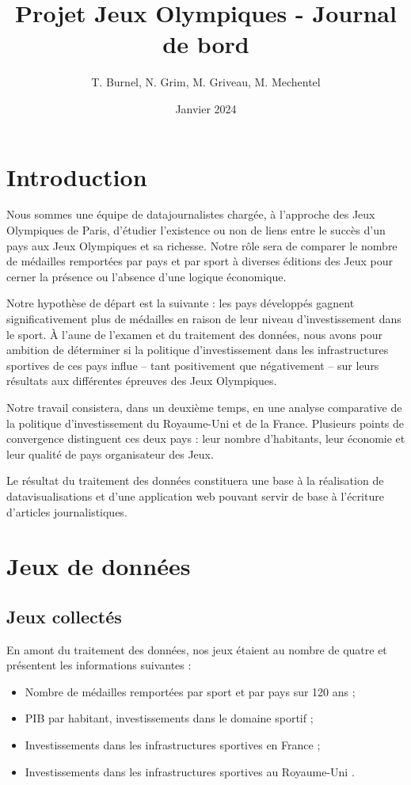 \documentclass[hidelinks, 12pt]{article}
\title{Projet Jeux Olympiques - Journal de bord}
\date{Janvier 2024}
\author{T. Burnel, N. Grim, M. Griveau, M. Mechentel}
\begin{document}
\maketitle
	
\section{Introduction}
	
Nous sommes une équipe de datajournalistes chargée, à l'approche des Jeux Olympiques de Paris, d'étudier l'existence ou non de liens entre le succès d'un pays aux Jeux Olympiques et sa richesse. Notre rôle sera de comparer le nombre de médailles remportées par pays et par sport à diverses éditions des Jeux pour cerner la présence ou l'absence d'une logique économique.
	
Notre hypothèse de départ est la suivante : les pays développés gagnent significativement plus de médailles en raison de leur niveau d'investissement dans le sport. À l’aune de l’examen et du traitement des données, nous avons pour ambition de déterminer si la politique d’investissement dans les infrastructures sportives de ces pays influe -- tant positivement que négativement -- sur leurs résultats aux différentes épreuves des Jeux Olympiques.
	
Notre travail consistera, dans un deuxième temps, en une analyse comparative de la politique d'investissement du Royaume-Uni et de la France. Plusieurs points de convergence distinguent ces deux pays : leur nombre d'habitants, leur économie et leur qualité de pays organisateur des Jeux.
	
Le résultat du traitement des données constituera une base à la réalisation de datavisualisations et d'une application web pouvant servir de base à l'écriture d'articles journalistiques.
	
	
\section{Jeux de données}
	
\subsection{Jeux collectés}

En amont du traitement des données, nos jeux étaient au nombre de quatre et présentent les informations suivantes :
\begin{itemize}
\item Nombre de médailles remportées par sport et par pays sur 120 ans\autocite{kaggle} ;
\item PIB par habitant, investissements dans le domaine sportif\autocite{fmi} ;
\item Investissements dans les infrastructures sportives en France\autocite{ministere} ;
\item Investissements dans les infrastructures sportives au Royaume-Uni\autocite{ru} .
\end{itemize}
\end{document}
